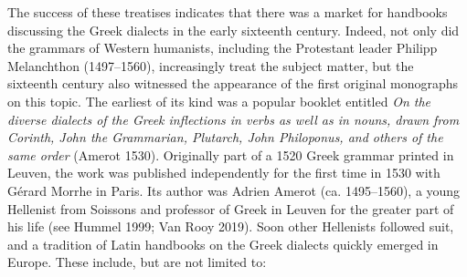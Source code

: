 \documentclass[12pt]{article}
\newenvironment{styleStandard}{\renewcommand\baselinestretch{1.25}\setlength\leftskip{0in}\setlength\rightskip{0in}\setlength\parindent{0.1972in}\setlength\parfillskip{0pt plus 1fil}\setlength\parskip{0in plus 1pt}\writerlistparindent\writerlistleftskip\leavevmode\normalfont\normalsize\writerlistlabel\ignorespaces}{\unskip\vspace{0in plus 1pt}\par}
\newcommand\writerlistleftskip{}
\newcommand\writerlistparindent{}
\newcommand\writerlistlabel{}
\begin{document}
\begin{styleStandard}
The success of these treatises indicates that there was a market for handbooks discussing the Greek dialects in the early sixteenth century. Indeed, not only did the grammars of Western humanists, including the Protestant leader Philipp Melanchthon (1497–1560), increasingly treat the subject matter, but the sixteenth century also witnessed the appearance of the first original monographs on this topic. The earliest of its kind was a popular booklet entitled \textit{On the diverse dialects of the Greek inflections in verbs as well as in nouns, drawn from Corinth, John the Grammarian, Plutarch, John Philoponus, and others of the same order} (Amerot 1530). Originally part of a 1520 Greek grammar printed in Leuven, the work was published independently for the first time in 1530 with Gérard Morrhe in Paris. Its author was Adrien Amerot (ca. 1495–1560), a young Hellenist from Soissons and professor of Greek in Leuven for the greater part of his life (see Hummel 1999; Van Rooy 2019). Soon other Hellenists followed suit, and a tradition of Latin handbooks on the Greek dialects quickly emerged in Europe. These include, but are not limited to:
\end{styleStandard}
\end{document}
